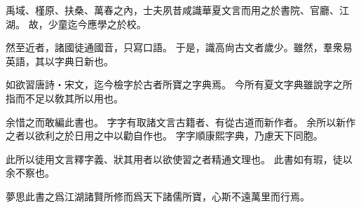 禹域、槿原、扶桑、萬春之內，士夫夙昔咸識華夏文言而用之於書院、官廳、江湖。
故，少童迄今應學之於校。

然至近者，諸國徒通國音，只寫口語。
于是，識高尙古文者歲少。雖然，羣衆易英語，其以字典日新也。

如欲習唐詩・宋文，迄今檢字於古者所寶之字典焉。
今所有夏文字典雖說字之所指而不足以敎其所以用也。

余惜之而敢編此書也。
字字有取諸文言古籍者、有從古道而新作者。
余所以新作之者以欲利之於日用之中以勸自作也。
字字順康熙字典，乃慮天下同胞。

此所以徒用文言釋字義、狀其用者以欲使習之者精通文理也。
此書如有瑕，徒以余不察也。

夢思此書之爲江湖諸賢所修而爲天下諸儒所寶，心斯不遠萬里而行焉。
